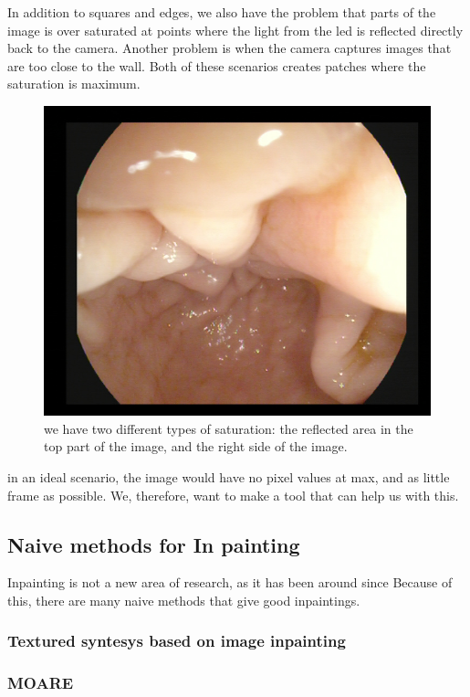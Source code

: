   In addition to squares and edges, we also have the problem that parts of the image is over saturated at points where the light from the led is reflected directly back to the camera.
  Another problem is when the camera captures images that are too close to the wall. Both of these scenarios creates patches where the saturation is maximum. 
   \begin{figure}[ht]
    \centering
    \includegraphics[scale=0.5]{background/figures/reflection.jpg}
    \caption{we have two different types of saturation: the reflected area in the top part of the image, and the right side of the image.}
  \end{figure}
  in an ideal scenario, the image would have no pixel values at max, and as little frame as possible. 
  We, therefore, want to make a tool that can help us with this.
  \subsection{Naive methods for In painting}
    Inpainting is not a new area of research, as it has been around since %
    Because of this, there are many naive methods that give good inpaintings. 
    
    \subsubsection{Textured syntesys based on image inpainting}
    \subsubsection{MOARE}
